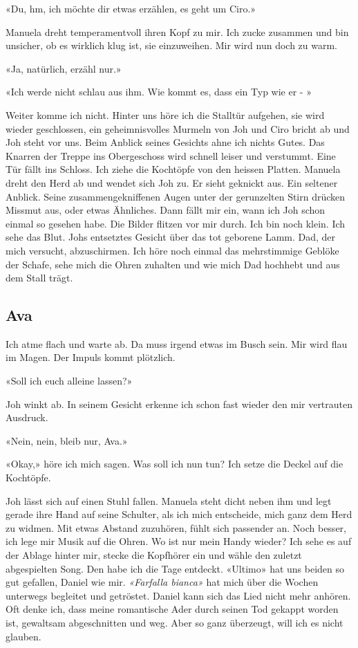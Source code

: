 «Du, hm, ich möchte dir etwas erzählen, es geht um Ciro.»

Manuela dreht temperamentvoll ihren Kopf zu mir. Ich zucke zusammen
und bin unsicher, ob es wirklich klug ist, sie einzuweihen. Mir wird nun
doch zu warm.

«Ja, natürlich, erzähl nur.»

«Ich werde nicht schlau aus ihm. Wie kommt es, dass ein Typ wie er - »

Weiter komme ich nicht. Hinter uns höre ich die Stalltür aufgehen, sie
wird wieder geschlossen, ein geheimnisvolles Murmeln von Joh und Ciro
bricht ab und Joh steht vor uns. Beim Anblick seines Gesichts ahne ich
nichts Gutes. Das Knarren der Treppe ins Obergeschoss wird schnell
leiser und verstummt. Eine Tür fällt ins Schloss. Ich ziehe die
Kochtöpfe von den heissen Platten. Manuela dreht den Herd ab und wendet
sich Joh zu. Er sieht geknickt aus. Ein seltener Anblick. Seine
zusammengekniffenen Augen unter der gerunzelten Stirn drücken Missmut aus,
oder etwas Ähnliches. Dann fällt mir ein, wann ich Joh schon einmal so
gesehen habe. Die Bilder flitzen vor mir durch. Ich bin noch klein. 
Ich sehe das Blut. Johs entsetztes Gesicht über das tot geborene Lamm. 
Dad, der mich versucht, abzuschirmen. 
Ich höre noch einmal das mehrstimmige Geblöke der Schafe, 
sehe mich die Ohren zuhalten und wie mich Dad hochhebt und aus dem Stall 
trägt.

\subsection{Ava}

Ich atme flach und warte ab. Da muss irgend etwas im Busch sein. Mir
wird flau im Magen. Der Impuls kommt plötzlich.

«Soll ich euch alleine lassen?»

Joh winkt ab. In seinem Gesicht erkenne ich schon fast wieder den mir
vertrauten Ausdruck.

«Nein, nein, bleib nur, Ava.»

«Okay,» höre ich mich sagen. Was soll ich nun tun? Ich setze die Deckel
auf die Kochtöpfe.

Joh lässt sich auf einen Stuhl fallen. Manuela steht dicht neben ihm und legt
gerade ihre Hand auf seine Schulter, als ich mich entscheide, mich ganz
dem Herd zu widmen. Mit etwas Abstand zuzuhören, fühlt sich passender
an. Noch besser, ich lege mir Musik auf die Ohren.
Wo ist nur mein Handy wieder? Ich sehe es auf der Ablage hinter mir,
stecke die Kopfhörer ein und wähle den zuletzt abgespielten Song. Den
habe ich die Tage entdeckt. «Ultimo» hat uns beiden so gut
gefallen, Daniel wie mir. \emph{«Farfalla bianca»} hat mich über die
Wochen unterwegs begleitet und getröstet. Daniel kann sich das Lied nicht
mehr anhören. Oft denke ich, dass meine romantische Ader durch
seinen Tod gekappt worden ist, gewaltsam abgeschnitten und weg. Aber so
ganz überzeugt, will ich es nicht glauben.

